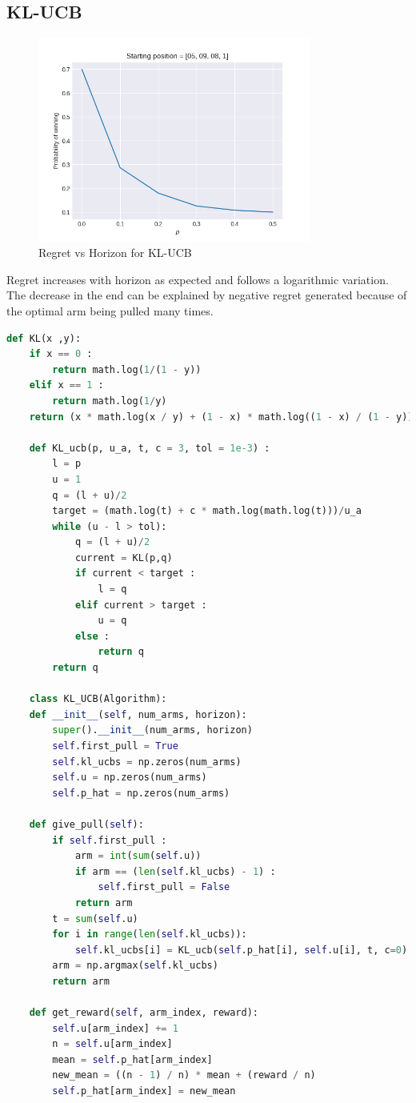 \documentclass[11pt]{article}
\begin{document}
   \subsection*{KL-UCB}
 \begin{figure}[H]
    \begin{center}
        \includegraphics[width=0.8\textwidth]{../images/plot1.png}
        
        \caption{Regret vs Horizon for KL-UCB}
    \end{center}
 \end{figure} 
 Regret increases with horizon as expected and follows a logarithmic variation. The decrease
 in the end can be explained by negative regret generated because of the optimal arm being pulled many times.
 \begin{lstlisting}[language=Python]      
    def KL(x ,y):
    if x == 0 :
        return math.log(1/(1 - y))
    elif x == 1 :
        return math.log(1/y)
    return (x * math.log(x / y) + (1 - x) * math.log((1 - x) / (1 - y)))

    def KL_ucb(p, u_a, t, c = 3, tol = 1e-3) : 
        l = p
        u = 1
        q = (l + u)/2   
        target = (math.log(t) + c * math.log(math.log(t)))/u_a
        while (u - l > tol):
            q = (l + u)/2
            current = KL(p,q)
            if current < target :
                l = q
            elif current > target :
                u = q
            else :
                return q
        return q  

    class KL_UCB(Algorithm):
    def __init__(self, num_arms, horizon):
        super().__init__(num_arms, horizon)
        self.first_pull = True
        self.kl_ucbs = np.zeros(num_arms)
        self.u = np.zeros(num_arms)
        self.p_hat = np.zeros(num_arms)
    
    def give_pull(self):
        if self.first_pull :
            arm = int(sum(self.u))
            if arm == (len(self.kl_ucbs) - 1) :
                self.first_pull = False
            return arm
        t = sum(self.u)
        for i in range(len(self.kl_ucbs)):
            self.kl_ucbs[i] = KL_ucb(self.p_hat[i], self.u[i], t, c=0)
        arm = np.argmax(self.kl_ucbs)
        return arm
    
    def get_reward(self, arm_index, reward):
        self.u[arm_index] += 1
        n = self.u[arm_index]
        mean = self.p_hat[arm_index]
        new_mean = ((n - 1) / n) * mean + (reward / n)
        self.p_hat[arm_index] = new_mean\end{lstlisting}
\end{document}
